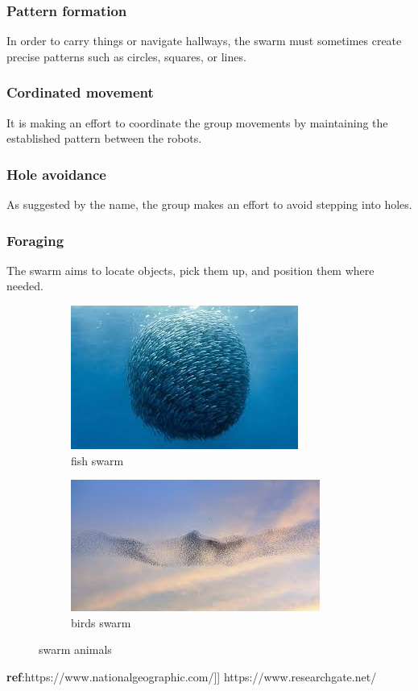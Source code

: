 \documentclass[12pt]{extarticle}
\begin{document}
\subsubsection{Pattern formation}
In order to carry things or navigate hallways, the swarm must sometimes create precise patterns such as circles, squares, or lines.
\subsubsection{Cordinated movement}
It is making an effort to coordinate the group movements by maintaining the established pattern between the robots.
\subsubsection{Hole avoidance}
As suggested by the name, the group makes an effort to avoid stepping into holes.
\subsubsection{Foraging}
The swarm aims to locate objects, pick them up, and position them where needed.





\begin{figure}
\centering
\begin{subfigure}{.5\textwidth}
  \centering
  \includegraphics[width=.8\linewidth]{swarmfish}
  \caption{fish swarm}
  \label{fig:sub1}
\end{subfigure}%
\begin{subfigure}{.5\textwidth}
  \centering
  \includegraphics[width=.8\linewidth]{swarmbirds }
  \caption{birds swarm  }
  \label{fig:sub2}
\end{subfigure}
\caption{swarm animals}
\label{fig:test}
\end{figure}
\textbf{ref}:https://www.nationalgeographic.com/]]
https://www.researchgate.net/
\end{document}
